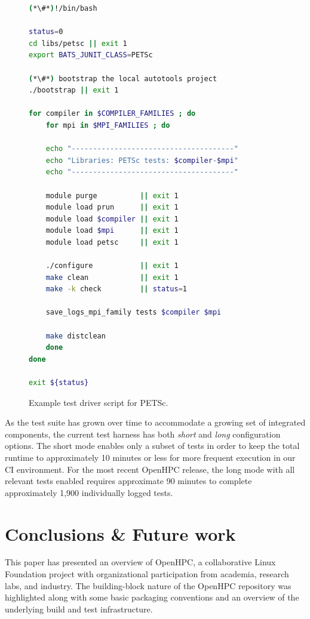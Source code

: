 \documentclass{sig-alternate-05-2015}
\begin{document}
\begin{figure}[t]
\begin{lstlisting}[language=bash,keywords={},keepspaces]
(*\#*)!/bin/bash

status=0
cd libs/petsc || exit 1
export BATS_JUNIT_CLASS=PETSc

(*\#*) bootstrap the local autotools project 
./bootstrap || exit 1

for compiler in $COMPILER_FAMILIES ; do
    for mpi in $MPI_FAMILIES ; do

    echo "--------------------------------------"
    echo "Libraries: PETSc tests: $compiler-$mpi"
    echo "--------------------------------------"

    module purge          || exit 1
    module load prun      || exit 1
    module load $compiler || exit 1
    module load $mpi      || exit 1
    module load petsc     || exit 1

    ./configure           || exit 1
    make clean            || exit 1
    make -k check         || status=1

    save_logs_mpi_family tests $compiler $mpi

    make distclean
    done
done

exit ${status}
\end{lstlisting}
\vspace*{-0.3cm}
\caption{Example test driver script for PETSc.}
\label{fig:test_loop}
\end{figure}

As the test suite has grown over time to accommodate a growing set of integrated
components, the current test harness has both {\em short} and {\em long}
configuration options.  The short mode enables only a subset of tests in order
to keep the total runtime to approximately 10 minutes or less for more frequent
execution in our CI environment. For the most recent OpenHPC release, the long
mode with all relevant tests enabled requires approximate 90 minutes to complete
approximately 1,900 individually logged tests.


\section{Conclusions \& Future work}
This paper has presented an overview of OpenHPC, a collaborative Linux
Foundation project with organizational participation from academia, research
labs, and industry. The building-block nature of the OpenHPC repository was
highlighted along with some basic packaging conventions and an overview of the
underlying build and test infrastructure.
\end{document}
